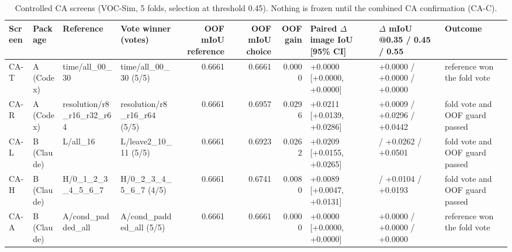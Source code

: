 \begin{table}[H]\centering\scriptsize\setlength{\tabcolsep}{3pt}
\begin{tabular}{>{\raggedright\arraybackslash}p{1.40cm}>{\raggedright\arraybackslash}p{1.40cm}>{\raggedright\arraybackslash}p{1.40cm}>{\raggedright\arraybackslash}p{1.40cm}rrr>{\raggedright\arraybackslash}p{1.40cm}>{\raggedright\arraybackslash}p{1.40cm}>{\raggedright\arraybackslash}p{1.40cm}}
\toprule
Screen & Package & Reference & Vote winner (votes) & OOF mIoU reference & OOF mIoU choice & OOF gain & Paired $\Delta$ image IoU [95\% CI] & $\Delta$ mIoU @0.35 /\allowbreak{} 0.45 /\allowbreak{} 0.55 & Outcome \\
\midrule
CA-T & A (Codex) & time/\allowbreak{}all\_\allowbreak{}00\_\allowbreak{}30 & time/\allowbreak{}all\_\allowbreak{}00\_\allowbreak{}30 (5/\allowbreak{}5) & 0.6661 & 0.6661 & 0.0000 & +0.0000 [+0.0000, +0.0000] & +0.0000 /\allowbreak{} +0.0000 /\allowbreak{} +0.0000 & reference won the fold vote \\
CA-R & A (Codex) & resolution/\allowbreak{}r8\_\allowbreak{}r16\_\allowbreak{}r32\_\allowbreak{}r64 & resolution/\allowbreak{}r8\_\allowbreak{}r16\_\allowbreak{}r64 (5/\allowbreak{}5) & 0.6661 & 0.6957 & 0.0296 & +0.0211 [+0.0139, +0.0286] & +0.0009 /\allowbreak{} +0.0296 /\allowbreak{} +0.0442 & fold vote and OOF guard passed \\
CA-L & B (Claude) & L/\allowbreak{}all\_\allowbreak{}16 & L/\allowbreak{}leave2\_\allowbreak{}10\_\allowbreak{}11 (5/\allowbreak{}5) & 0.6661 & 0.6923 & 0.0262 & +0.0209 [+0.0155, +0.0265] & -0.0021 /\allowbreak{} +0.0262 /\allowbreak{} +0.0501 & fold vote and OOF guard passed \\
CA-H & B (Claude) & H/\allowbreak{}0\_\allowbreak{}1\_\allowbreak{}2\_\allowbreak{}3\_\allowbreak{}4\_\allowbreak{}5\_\allowbreak{}6\_\allowbreak{}7 & H/\allowbreak{}0\_\allowbreak{}2\_\allowbreak{}3\_\allowbreak{}4\_\allowbreak{}5\_\allowbreak{}6\_\allowbreak{}7 (4/\allowbreak{}5) & 0.6661 & 0.6741 & 0.0080 & +0.0089 [+0.0047, +0.0131] & -0.0002 /\allowbreak{} +0.0104 /\allowbreak{} +0.0193 & fold vote and OOF guard passed \\
CA-A & B (Claude) & A/\allowbreak{}cond\_\allowbreak{}padded\_\allowbreak{}all & A/\allowbreak{}cond\_\allowbreak{}padded\_\allowbreak{}all (5/\allowbreak{}5) & 0.6661 & 0.6661 & 0.0000 & +0.0000 [+0.0000, +0.0000] & +0.0000 /\allowbreak{} +0.0000 /\allowbreak{} +0.0000 & reference won the fold vote \\
\bottomrule
\end{tabular}
\caption{Controlled CA screens (VOC-Sim, 5 folds, selection at threshold 0.45). Nothing is frozen until the combined CA confirmation (CA-C).}\label{tab:a_cv_summary}
\end{table}

